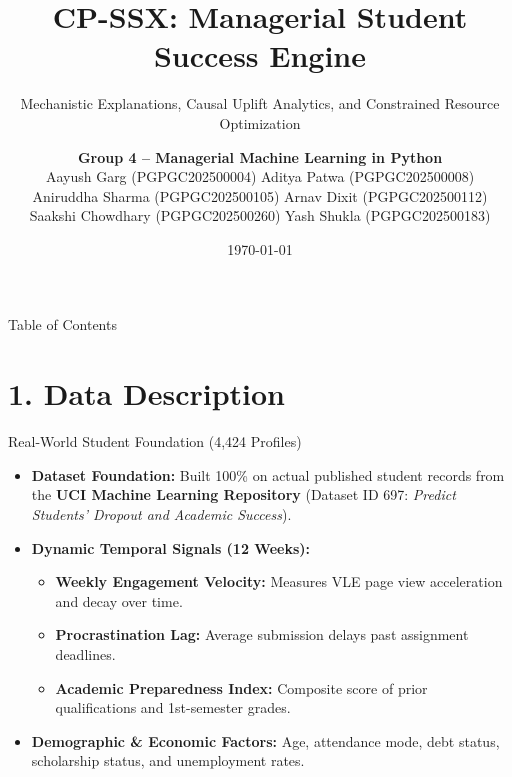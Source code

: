 \documentclass[aspectratio=169, 10pt]{beamer}
\title[CP-SSX Engine]{CP-SSX: Managerial Student Success Engine}
\subtitle{Mechanistic Explanations, Causal Uplift Analytics, and Constrained Resource Optimization}
\author[Group 4, MMLP]{
  \textbf{Group 4 -- Managerial Machine Learning in Python}\\[0.3em]
  \footnotesize
  Aayush Garg (PGPGC202500004) \quad Aditya Patwa (PGPGC202500008)\\
  Aniruddha Sharma (PGPGC202500105) \quad Arnav Dixit (PGPGC202500112)\\
  Saakshi Chowdhary (PGPGC202500260) \quad Yash Shukla (PGPGC202500183)
}
\institute[Group 4, MMLP]{Indian Institute of Management Ahmedabad}
\date{\today}
\begin{document}
\begin{frame}
  \titlepage
\end{frame}

\begin{frame}{Table of Contents}
  \tableofcontents
\end{frame}

\section{1. Data Description}

\begin{frame}{Real-World Student Foundation (4,424 Profiles)}
  \begin{itemize}
    \item \textbf{Dataset Foundation:} Built 100\% on actual published student records from the \textbf{UCI Machine Learning Repository} (Dataset ID 697: \textit{Predict Students' Dropout and Academic Success}).
    \item \textbf{Dynamic Temporal Signals (12 Weeks):}
      \begin{itemize}
        \item \textbf{Weekly Engagement Velocity:} Measures VLE page view acceleration and decay over time.
        \item \textbf{Procrastination Lag:} Average submission delays past assignment deadlines.
        \item \textbf{Academic Preparedness Index:} Composite score of prior qualifications and 1st-semester grades.
      \end{itemize}
    \item \textbf{Demographic \& Economic Factors:} Age, attendance mode, debt status, scholarship status, and unemployment rates.
  \end{itemize}
\end{frame}
\end{document}
